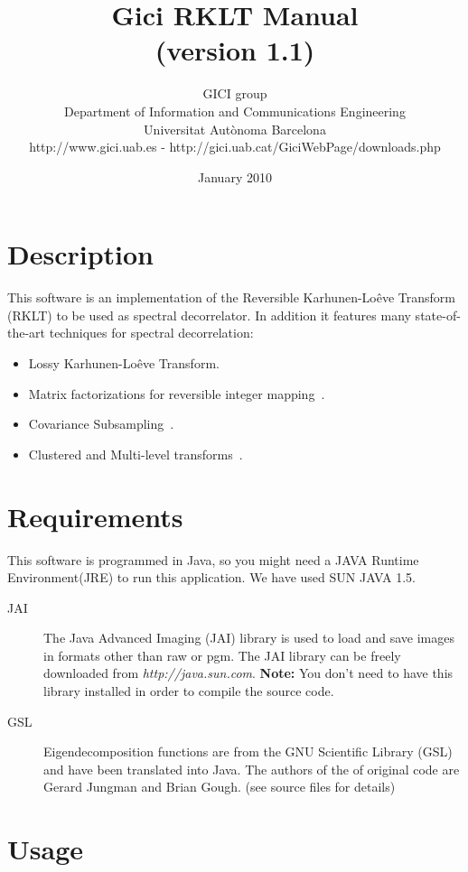 \documentclass[a4paper,10pt]{article}
\title{Gici RKLT Manual \\ \small (version 1.1)}
\author{
GICI group \vspace{0.1cm} \\
\small Department of Information and Communications Engineering \\
\small Universitat Aut{\`o}noma Barcelona \\
\small http://www.gici.uab.es  -  http://gici.uab.cat/GiciWebPage/downloads.php \\
}
\date{January 2010}
\begin{document}
\maketitle

\section{Description}

This software is an implementation of the Reversible Karhunen-Lo\^eve Transform (RKLT) to be used as spectral decorrelator.
In addition it features many state-of-the-art techniques for spectral decorrelation:

\begin{itemize}
\item Lossy Karhunen-Lo\^eve Transform.
\item Matrix factorizations for reversible integer mapping~\cite{HS01,GS04}.
\item Covariance Subsampling~\cite{PTM+06,PTM+07a}.
\item Clustered and Multi-level transforms~\cite{BS09,BS10}.
\end{itemize}

\section{Requirements}

This software is programmed in Java, so you might need a JAVA Runtime Environment(JRE) to run this application.
We have used SUN JAVA 1.5. 

\begin{description}
\item[JAI] The Java Advanced Imaging (JAI) library is used to load and save images in formats
other than raw or pgm. The JAI library can be freely downloaded from \emph{http://java.sun.com}.
\textbf{Note:} You don't need to have this library installed in order to compile the source code.

\item[GSL] Eigendecomposition functions are from the GNU Scientific Library (GSL) and have been translated into Java.
The authors of the of original code are Gerard Jungman and Brian Gough. (see source files for details)
\end{description}

\section{Usage}
\end{document}
